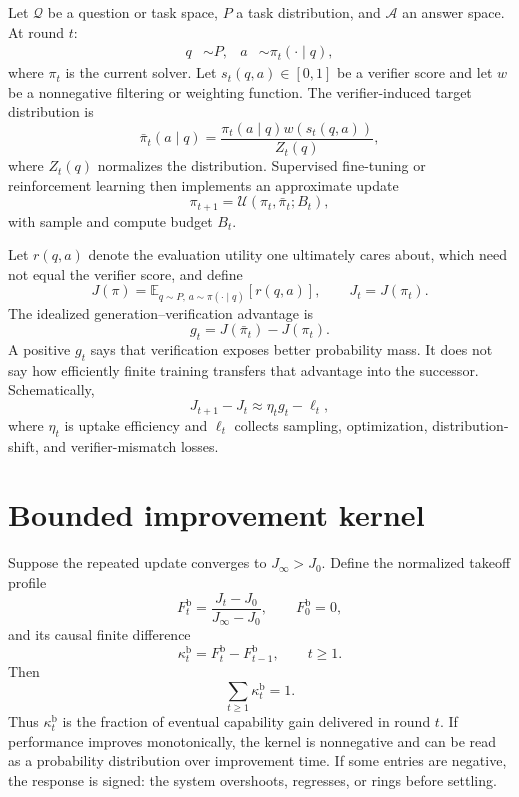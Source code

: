 \documentclass[10pt,twocolumn]{article}
\begin{document}
Let $\mathcal Q$ be a question or task space, $P$ a task distribution, and
$\mathcal A$ an answer space.  At round $t$:
\begin{align}
q&\sim P, & a&\sim\pi_t(\cdot\mid q),
\end{align}
where $\pi_t$ is the current solver.  Let
$s_t(q,a)\in[0,1]$ be a verifier score and let $w$ be a nonnegative filtering
or weighting function.  The verifier-induced target distribution is
\begin{equation}
\bar\pi_t(a\mid q)
=\frac{\pi_t(a\mid q)w(s_t(q,a))}{Z_t(q)},
\end{equation}
where $Z_t(q)$ normalizes the distribution.  Supervised fine-tuning or
reinforcement learning then implements an approximate update
\begin{equation}
\pi_{t+1}=\mathcal U(\pi_t,\bar\pi_t;B_t),
\end{equation}
with sample and compute budget $B_t$.

Let $r(q,a)$ denote the evaluation utility one ultimately cares about, which
need not equal the verifier score, and define
\begin{equation}
J(\pi)=\mathbb E_{q\sim P,\,a\sim\pi(\cdot\mid q)}[r(q,a)],
\qquad J_t=J(\pi_t).
\end{equation}
The idealized generation--verification advantage is
\begin{equation}
g_t=J(\bar\pi_t)-J(\pi_t).
\end{equation}
A positive $g_t$ says that verification exposes better probability mass.  It
does not say how efficiently finite training transfers that advantage into the
successor.  Schematically,
\begin{equation}
J_{t+1}-J_t\approx \eta_t g_t-\ell_t,
\end{equation}
where $\eta_t$ is uptake efficiency and $\ell_t$ collects sampling,
optimization, distribution-shift, and verifier-mismatch losses.

\section{Bounded improvement kernel}

Suppose the repeated update converges to $J_\infty>J_0$.  Define the normalized
takeoff profile
\begin{equation}
F_t^{\mathrm b}=\frac{J_t-J_0}{J_\infty-J_0},
\qquad F_0^{\mathrm b}=0,
\end{equation}
and its causal finite difference
\begin{equation}
\kappa_t^{\mathrm b}=F_t^{\mathrm b}-F_{t-1}^{\mathrm b},
\qquad t\ge1.
\end{equation}
Then
\begin{equation}
\sum_{t\ge1}\kappa_t^{\mathrm b}=1.
\end{equation}
Thus $\kappa_t^{\mathrm b}$ is the fraction of eventual capability gain
delivered in round $t$.  If performance improves monotonically, the kernel is
nonnegative and can be read as a probability distribution over improvement
time.  If some entries are negative, the response is signed: the system
overshoots, regresses, or rings before settling.
\end{document}
